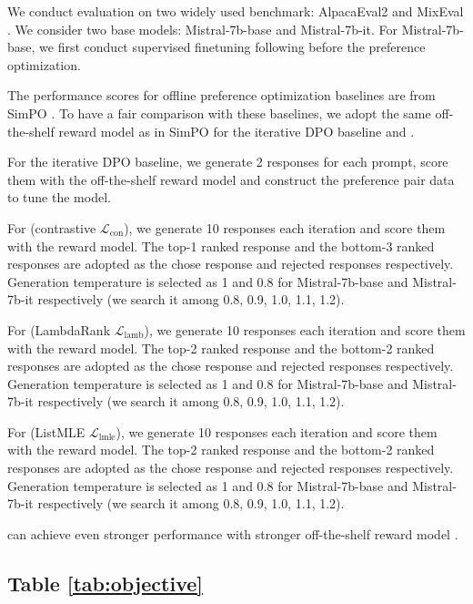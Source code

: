We conduct evaluation on two widely used benchmark: AlpacaEval2 \citep{dubois2024length} and MixEval \citep{ni2024mixeval}.
We consider two base models: Mistral-7b-base and Mistral-7b-it. For Mistral-7b-base, we first conduct supervised finetuning following \citet{meng2024simpo} before the preference optimization.

The performance scores for offline preference optimization baselines are from SimPO \citep{meng2024simpo}.
To have a fair comparison with these baselines, we adopt the same off-the-shelf reward model \citep{jiang2023llm} as in SimPO for the iterative DPO baseline and \Ours.

For the iterative DPO baseline, we generate 2 responses for each prompt, score them with the off-the-shelf reward model and construct the preference pair data to tune the model.

For \Ours (contrastive $\mathcal{L}_{\text{con}}$), we generate 10 responses each iteration and score them with the reward model. The top-1 ranked response and the bottom-3 ranked responses are adopted as the chose response and rejected responses respectively.
Generation temperature is selected as 1 and 0.8 for Mistral-7b-base and Mistral-7b-it respectively (we search it among 0.8, 0.9, 1.0, 1.1, 1.2).

For \Ours (LambdaRank $\mathcal{L}_{\text{lamb}}$), we generate 10 responses each iteration and score them with the reward model. The top-2 ranked response and the bottom-2 ranked responses are adopted as the chose response and rejected responses respectively.
Generation temperature is selected as 1 and 0.8 for Mistral-7b-base and Mistral-7b-it respectively (we search it among 0.8, 0.9, 1.0, 1.1, 1.2).

For \Ours (ListMLE $\mathcal{L}_{\text{lmle}}$), we generate 10 responses each iteration and score them with the reward model. The top-2 ranked response and the bottom-2 ranked responses are adopted as the chose response and rejected responses respectively.
Generation temperature is selected as 1 and 0.8 for Mistral-7b-base and Mistral-7b-it respectively (we search it among 0.8, 0.9, 1.0, 1.1, 1.2).

\Ours can achieve even stronger performance with stronger off-the-shelf reward model \citep{dong2024rlhf}.

\subsection{Table \ref{tab:objective}}\label{apx:sec-objective-setting}

